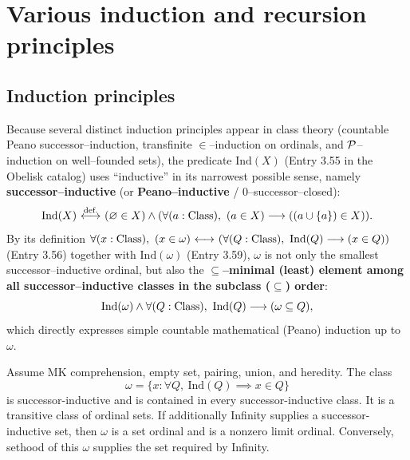 


\section{Various induction and recursion principles}
\subsection{Induction principles}
\begin{note}
Because several distinct induction principles appear in class theory (countable Peano successor--induction, transfinite $\in$--induction on ordinals, and $\mathcal{P}$--induction on well--founded sets), the predicate $\mathrm{Ind}(X)$ (Entry 3.55 in the Obelisk catalog) uses ``inductive'' in its narrowest possible sense, namely \textbf{successor--inductive} (or \textbf{Peano--inductive} / $0$--successor--closed):
\[
\mathrm{Ind}(X) \ {\stackrel{{\textrm{def.}}}{\longleftrightarrow}}\  (\varnothing \in X) \land (\forall (a:{\text{Class}}),\ (a \in X) \longrightarrow ((a \cup \{a\}) \in X)).
\]
By its definition $\forall (x:{\text{Class}}),\ (x \in \omega) {\ \longleftrightarrow\ } (\forall (Q:{\text{Class}}),\ \mathrm{Ind}(Q) \longrightarrow (x \in Q))$ (Entry 3.56) together with $\mathrm{Ind}(\omega)$ (Entry 3.59), $\omega$ is not only the smallest successor--inductive ordinal, but also the \textbf{$\subseteq$--minimal (least) element among all successor--inductive classes in the subclass ($\subseteq$) order}:
\[
\mathrm{Ind}(\omega) \land \forall (Q:{\text{Class}}),\ \mathrm{Ind}(Q) \longrightarrow (\omega \subseteq Q),
\]
which directly expresses simple countable mathematical (Peano) induction up to $\omega$.
\end{note}
\begin{proposition}
\label{thm:omega_set_limit}
Assume MK comprehension, empty set, pairing, union, and heredity.
The class
\[
\omega=\{x:\forall Q,\ \mathrm{Ind}(Q)\implies x\in Q\}
\]
is successor-inductive and is contained in every successor-inductive
class. It is a transitive class of ordinal sets. If additionally
Infinity supplies a successor-inductive set, then $\omega$ is a set
ordinal and is a nonzero limit ordinal. Conversely, sethood of this
$\omega$ supplies the set required by Infinity.
\end{proposition}
